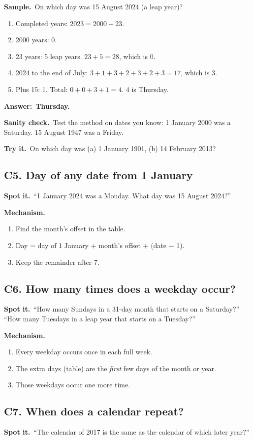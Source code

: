 \documentclass[11pt,a4paper]{article}
\let\oldsubsection\subsection
\renewcommand{\subsection}{\needspace{9\baselineskip}\oldsubsection}
\newcommand{\spot}{\textbf{\color{ember}Spot it.}\ }
\newcommand{\mech}{\textbf{\color{ember}Mechanism.}\ }
\newif\ifkeepsamp
\newcommand{\ans}[1]{\par\nopagebreak\noindent\textbf{\color{ember}Answer:}\ \textbf{#1}\par}
\newcommand{\samp}{\ifkeepsamp\needspace{4\baselineskip}\fi\textbf{\color{ember}Sample.}\ }
\newcommand{\sane}{\textbf{\color{slate}Sanity check.}\ }
\newcommand{\tryit}[1]{\textbf{\color{ember}Try it.}\ #1}
\begin{document}
\samp On which day was 15 August 2024 (a leap year)?
\begin{enumerate}
\item Completed years: $2023 = 2000 + 23$.
\item 2000 years: 0.
\item 23 years: 5 leap years. $23 + 5 = 28$, which is 0.
\item 2024 to the end of July: $3 + 1 + 3 + 2 + 3 + 2 + 3 = 17$, which is 3.
\item Plus 15: 1. Total: $0 + 0 + 3 + 1 = 4$. 4 is Thursday.
\end{enumerate}
\ans{Thursday.}

\sane Test the method on dates you know: 1 January 2000 was a Saturday. 15 August 1947 was a Friday.

\tryit On which day was (a) 1 January 1901, (b) 14 February 2013?

\subsection{C5. Day of any date from 1 January}
\spot ``1 January 2024 was a Monday. What day was 15 August 2024?''

\mech
\begin{enumerate}
\item Find the month's offset in the table.
\item Day = day of 1 January + month's offset + (date $-$ 1).
\item Keep the remainder after 7.
\end{enumerate}

\subsection{C6. How many times does a weekday occur?}
\spot ``How many Sundays in a 31-day month that starts on a Saturday?'' ``How many Tuesdays in a leap year that starts on a Tuesday?''

\mech
\begin{enumerate}
\item Every weekday occurs once in each full week.
\item The extra days (table) are the \emph{first} few days of the month or year.
\item Those weekdays occur one more time.
\end{enumerate}

\subsection{C7. When does a calendar repeat?}
\spot ``The calendar of 2017 is the same as the calendar of which later year?''
\end{document}
